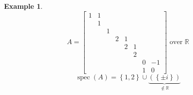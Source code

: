 \documentclass{article}
\newcounter{lecref}[section]
\numberwithin{lecref}{section}
\newtheorem{example}[lecref]{Example}
\newcommand{\set}[1]{\left\{#1\right\}}
\begin{document}
\begin{example} %
  \[
    A = \begin{bmatrix}
      1 & 1 &   &   &   &   &   & \\
        & 1 &   &   &   &   &   & \\
        &   & 1 &   &   &   &   & \\
        &   &   & 2 & 1 &   &   & \\
        &   &   &   & 2 & 1 &   & \\
        &   &   &   &   & 2 &   & \\
        &   &   &   &   &   & 0 & -1 \\
        &   &   &   &   &   & 1 & 0
    \end{bmatrix}
    \text{ over $\mathbb R$}
  \]
  \[ \operatorname{spec}(A) = \set{1,2} \cup \underbrace{(\set{\pm i})}_{\not\in \mathbb R} \]


\end{example}
\end{document}

